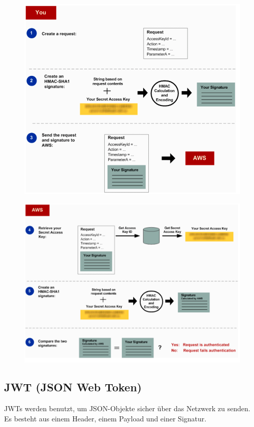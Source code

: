 \documentclass[a4paper, 11pt]{article}
\begin{document}
\begin{figure}[htb]
	\centering
	\includegraphics[keepaspectratio=true,height=19.2\baselineskip]{aws_security_1.PNG}
\end{figure}
\begin{figure}[htb]
	\centering
	\includegraphics[keepaspectratio=true,height=19.2\baselineskip]{aws_security_2.PNG}
\end{figure}

\newpage

\subsection{JWT (JSON Web Token)}
JWTs werden benutzt, um JSON-Objekte sicher über das Netzwerk zu senden. Es besteht aus einem Header, einem Payload und einer Signatur.
\end{document}
